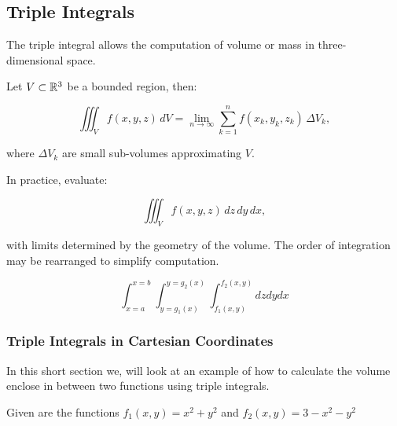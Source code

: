 \QED

\subsection{Triple Integrals}

The triple integral allows the computation of volume or mass in three-dimensional space.

Let \( V \subset \mathbb{R}^3 \) be a bounded region, then:

\[
    \iiint_V f(x, y, z)\, dV = \lim_{n \to \infty} \sum_{k=1}^n f(x_k, y_k, z_k) \, \Delta V_k,
\]

where \( \Delta V_k \) are small sub-volumes approximating \( V \).

In practice, evaluate:

\[
    \iiint_V f(x, y, z)\, dz\, dy\, dx,
\]

with limits determined by the geometry of the volume. The order of integration may be rearranged to simplify computation.

\[
    \int_{x=a}^{x=b}\int_{y=g_1(x)}^{y=g_2(x)} \int_{f_1(x,y)}^{f_2(x,y)} dz dy dx
\]

\subsubsection{Triple Integrals in Cartesian Coordinates}

In this short section we, will look at an example of how to calculate the volume enclose in
between two functions using triple integrals.

Given are the functions \(f_1(x,y) = x^2 + y^2\) and \(f_2(x,y) = 3 - x^2 - y^2\)


\begin{center}
    
\end{center}

